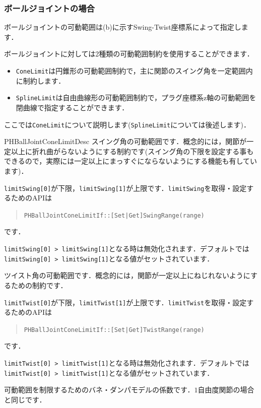 \subsubsection*{\KLUDGE ボールジョイントの場合}

\KLUDGE ボールジョイントの可動範囲は(b)\KLUDGE に示すSwing-Twist\KLUDGE 座標系によって指定します．

\KLUDGE ボールジョイントに対しては2\KLUDGE 種類の可動範囲制約を使用することができます．
\begin{itemize}
\item \texttt{ConeLimit}\KLUDGE は円錐形の可動範囲制約で，主に関節のスイング角を一定範囲内に制約します．
\item \texttt{SplineLimit}\KLUDGE は自由曲線形の可動範囲制約で，プラグ座標系z\KLUDGE 軸の可動範囲を閉曲線で指定することができます．
\end{itemize}

\KLUDGE ここでは\texttt{ConeLimit}\KLUDGE について説明します(\texttt{SplineLimit}\KLUDGE については後述します)\KLUDGE ．

\begin{reference}{PHBallJointConeLimitDesc}
\KLUDGE スイング角の可動範囲です．概念的には，関節が一定以上に折れ曲がらないようにする制約です(\KLUDGE スイング角の下限を設定する事もできるので，実際には一定以上にまっすぐにならないようにする機能も有しています)\KLUDGE ．

\texttt{limitSwing[0]}\KLUDGE が下限，\texttt{limitSwing[1]}\KLUDGE が上限です．\texttt{limitSwing}\KLUDGE を取得・設定するためのAPI\KLUDGE は
\begin{quote}
\texttt{PHBallJointConeLimitIf::[Set|Get]SwingRange(range)}
\end{quote}
\KLUDGE です．

\texttt{limitSwing[0] > limitSwing[1]}\KLUDGE となる時は無効化されます．デフォルトでは\texttt{limitSwing[0] > limitSwing[1]}\KLUDGE となる値がセットされています．

\KLUDGE ツイスト角の可動範囲です．概念的には，関節が一定以上にねじれないようにするための制約です．

\texttt{limitTwist[0]}\KLUDGE が下限，\texttt{limitTwist[1]}\KLUDGE が上限です．\texttt{limitTwist}\KLUDGE を取得・設定するためのAPI\KLUDGE は
\begin{quote}
\texttt{PHBallJointConeLimitIf::[Set|Get]TwistRange(range)}
\end{quote}
\KLUDGE です．

\texttt{limitTwist[0] > limitTwist[1]}\KLUDGE となる時は無効化されます．デフォルトでは\texttt{limitTwist[0] > limitTwist[1]}\KLUDGE となる値がセットされています．

 \Plus
{}
\KLUDGE 可動範囲を制限するためのバネ・ダンパモデルの係数です．$1$\KLUDGE 自由度関節の場合と同じです．
\end{reference}

